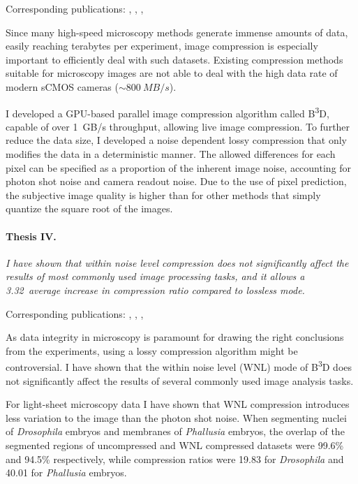 \documentclass{booklet_style}
\def\b3d{B\textsuperscript{3}D}
\begin{document}
    Corresponding publications: \cite{balazs_real-time_2017}, \cite{balazs_gpu-based_2016}, \cite{balazs_gpu-based_2016-1}, \cite{balazs_gpu-based_2017}
    
    Since many high-speed microscopy methods generate immense amounts of data, easily reaching terabytes per experiment, image compression is especially important to efficiently deal with such datasets. Existing compression methods suitable for microscopy images are not able to deal with the high data rate of modern sCMOS cameras ($\sim \SI{800}{MB/s}$).

    I developed a GPU-based parallel image compression algorithm called \b3d, capable of over \SI{1}{GB/s} throughput, allowing live image compression. To further reduce the data size, I developed a noise dependent lossy compression that only modifies the data in a deterministic manner. The allowed differences for each pixel can be specified as a proportion of the inherent image noise, accounting for photon shot noise and camera readout noise. Due to the use of pixel prediction, the subjective image quality is higher than for other methods that simply quantize the square root of the images.


  \paragraph{Thesis IV.} \textit{I have shown that within noise level compression does not significantly affect the results of most commonly used image processing tasks, and it allows a 3.32\texttimes\ average increase in compression ratio compared to lossless mode.}
  
    Corresponding publications: \cite{balazs_real-time_2017}, \cite{balazs_gpu-based_2016}, \cite{balazs_gpu-based_2016-1}, \cite{balazs_gpu-based_2017}
    
    As data integrity in microscopy is paramount for drawing the right conclusions from the experiments, using a lossy compression algorithm might be controversial.
    I have shown that the within noise level (WNL) mode of \b3d does not significantly affect the results of several commonly used image analysis tasks.
    
    For light-sheet microscopy data I have shown that WNL compression introduces less variation to the image than the photon shot noise. When segmenting nuclei of \textit{Drosophila} embryos and membranes of \textit{Phallusia} embryos, the overlap of the segmented regions of uncompressed and WNL compressed datasets were 99.6\% and 94.5\% respectively, while compression ratios were 19.83 for \textit{Drosophila} and 40.01 for \textit{Phallusia} embryos.
\end{document}
